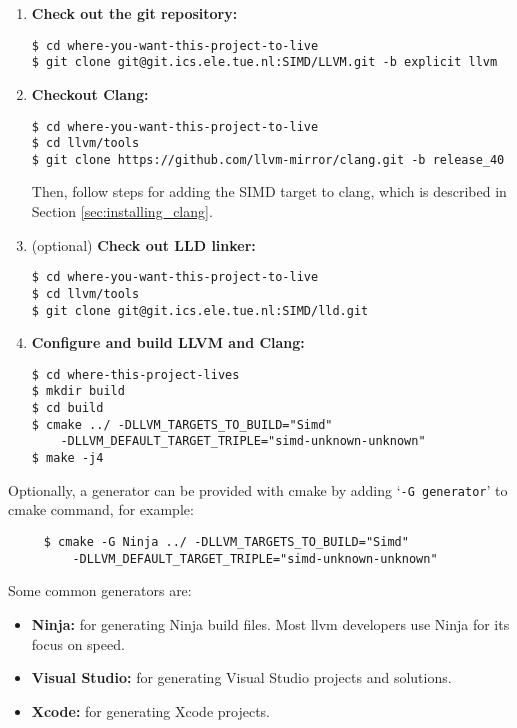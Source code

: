\lstset{style=customcmd}
\begin{enumerate}
\item \textbf{Check out the git repository:}
\begin{lstlisting}
$ cd where-you-want-this-project-to-live
$ git clone git@git.ics.ele.tue.nl:SIMD/LLVM.git -b explicit llvm
\end{lstlisting}
\item \textbf{Checkout Clang:}
\begin{lstlisting}
$ cd where-you-want-this-project-to-live
$ cd llvm/tools
$ git clone https://github.com/llvm-mirror/clang.git -b release_40
\end{lstlisting}
Then, follow steps for adding the SIMD target to clang, which is described in Section \ref{sec:installing_clang}.

\item (optional) \textbf{Check out LLD linker:}
\begin{lstlisting}
$ cd where-you-want-this-project-to-live
$ cd llvm/tools
$ git clone git@git.ics.ele.tue.nl:SIMD/lld.git
\end{lstlisting}

\item \textbf{Configure and build LLVM and Clang:}
\begin{lstlisting}
$ cd where-this-project-lives
$ mkdir build
$ cd build
$ cmake ../ -DLLVM_TARGETS_TO_BUILD="Simd" 
    -DLLVM_DEFAULT_TARGET_TRIPLE="simd-unknown-unknown"
$ make -j4
\end{lstlisting}

\end{enumerate}
	
Optionally, a generator can be provided with cmake by adding `\texttt{-G generator}' to cmake command, for example:
\begin{lstlisting}
     $ cmake -G Ninja ../ -DLLVM_TARGETS_TO_BUILD="Simd"
         -DLLVM_DEFAULT_TARGET_TRIPLE="simd-unknown-unknown"
\end{lstlisting}

Some common generators are:
\begin{itemize}
	\item \textbf{Ninja:} for generating Ninja build files. Most llvm developers use Ninja for its focus on speed.
	\item \textbf{Visual Studio:} for generating Visual Studio projects and solutions.
	\item \textbf{Xcode:} for generating Xcode projects.
\end{itemize}

